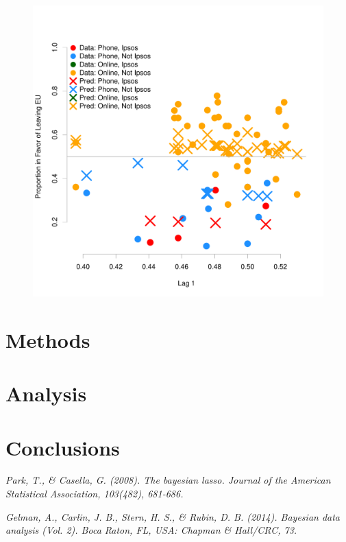 \documentclass{../../tex_template/asaproc}
\begin{document}
\begin{figure}[H]
  \includegraphics[scale=.5]{figs/preds.pdf}
  \caption{\small }
  \label{fig:allposts}
\end{figure}

\section{Methods}
\section{Analysis}
\section{Conclusions}

\begin{references}
{\footnotesize
\itemsep=3pt
\item {\em Park, T., \& Casella, G. (2008). The bayesian lasso. Journal of the American Statistical Association, 103(482), 681-686.}
\item {\em Gelman, A., Carlin, J. B., Stern, H. S., \& Rubin, D. B. (2014). Bayesian data analysis (Vol. 2). Boca Raton, FL, USA: Chapman \& Hall/CRC, 73.}
}

\end{references}
\end{document}
